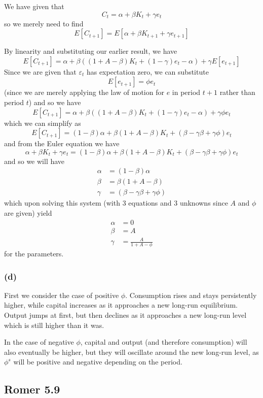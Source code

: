 \documentclass[11pt]{amsart}
\begin{document}
We have given that
\[
C_t = \alpha + \beta K_t + \gamma e_t
\]
so we merely need to find
\[
E[C_{t+1}] = E[\alpha + \beta K_{t+1} + \gamma e_{t+1}]
\]

By linearity and substituting our earlier result, we have
\[
E[C_{t+1}] = \alpha + \beta ((1 + A - \beta) K_t + (1-\gamma) e_t - \alpha) + \gamma E[e_{t+1}]
\]
Since we are given that $\varepsilon_t$ has expectation zero, we can substitute
\[
E[e_{t+1}] = \phi e_t
\]
(since we are merely applying the law of motion for $e$ in period $t+1$ rather than period $t$) and so we have
\[
E[C_{t+1}] = \alpha + \beta ((1 + A - \beta) K_t + (1-\gamma) e_t - \alpha) + \gamma \phi e_t
\]
which we can simplify as
\[
E[C_{t+1}] = (1 - \beta) \alpha + \beta (1 + A - \beta) K_t + (\beta - \gamma \beta + \gamma \phi) e_t
\]
and from the Euler equation we have
\[
\alpha + \beta K_t + \gamma e_t  = (1 - \beta) \alpha + \beta (1 + A - \beta) K_t + (\beta - \gamma \beta + \gamma \phi) e_t
\]
and so we will have
\begin{align*}
\alpha &= (1 - \beta) \alpha \\
\beta &= \beta (1 + A - \beta) \\
\gamma &= (\beta - \gamma \beta + \gamma \phi)
\end{align*}
which upon solving this system (with 3 equations and 3 unknowns since $A$ and $\phi$ are given) yield
\begin{align*}
\alpha &= 0 \\
\beta &= A\\
\gamma &= \frac{A}{1 + A - \phi}
\end{align*}
for the parameters.

\subsubsection*{(d)}

First we consider the case of positive $\phi$. Consumption rises and stays persistently higher, while capital increases as it approaches a new long-run equilibrium. Output jumps at first, but then declines as it approaches a new long-run level which is still higher than it was.

In the case of negative $\phi$, capital and output (and therefore consumption) will also eventually be higher, but they will oscillate around the new long-run level, as $\phi^s$ will be positive and negative depending on the period.

\subsection{Romer 5.9}
\end{document}
